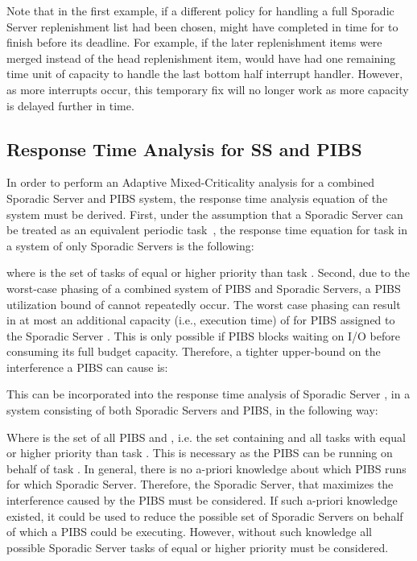 Note that in the first example, if a different policy for handling a full
Sporadic Server replenishment list had been chosen,  might have
completed in time for  to finish before its deadline.  For example, if
the later replenishment items were merged instead of the head replenishment
item,  would have had one remaining time unit of capacity to handle
the last bottom half interrupt handler.  However, as more interrupts occur,
this temporary fix will no longer work as more capacity is delayed further in
time.

\subsection{Response Time Analysis for SS and PIBS}

In order to perform an Adaptive Mixed-Criticality analysis for a combined
Sporadic Server and PIBS system, the response time analysis equation of the
system must be derived.  First, under the assumption that a Sporadic Server
can be treated as an equivalent periodic task~\cite{Sprunt90}, the response
time equation for task  in a system of only Sporadic Servers is the
following:

where  is the set of tasks of equal or higher
priority than task . Second, due to the worst-case phasing of a
combined system of PIBS and Sporadic Servers, a PIBS utilization bound of
 cannot repeatedly occur.  The worst case phasing can
result in at most an additional capacity (i.e., execution time) of  for PIBS  assigned to the Sporadic Server
. This is only possible if PIBS blocks waiting on I/O before consuming
its full budget capacity.
Therefore, a
tighter upper-bound on the interference a PIBS can cause is:

This can be incorporated into the response time analysis of Sporadic Server
, in a system consisting of both Sporadic Servers and PIBS, in the
following way:

Where  is the set of all PIBS and \mbox{}, i.e. the set
containing  and all tasks with equal or higher priority than task
.  This is necessary as the PIBS can be running on behalf of task
.  In general, there is no a-priori knowledge about which PIBS runs for
which Sporadic Server.  Therefore, the Sporadic Server,  that maximizes
the interference caused by the PIBS must be considered.  If such a-priori knowledge
existed, it could be used to reduce the possible set of Sporadic Servers on
  behalf of which a PIBS could be executing. However, without such knowledge all possible
Sporadic Server tasks of equal or higher priority must be considered.

